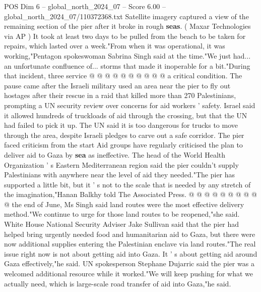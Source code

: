 \begin{textsample}{POS Dim 6 – global\_north\_2024\_07 – Score 6.00 – global\_north\_2024\_07/110372368.txt}
Satellite imagery captured a view of the remaining section of the pier after it broke in rough \textbf{seas}. ( Maxar Technologies via AP ) It took at least two days to be pulled from the beach to be taken for repairs, which lasted over a week."From when it was operational, it was working,"Pentagon spokeswoman Sabrina Singh said at the time."We just had... an unfortunate confluence of... storms that made it inoperable for a bit."During that incident, three service @ @ @ @ @ @ @ @ @ @ a critical condition.
The pause came after the Israeli military used an area near the pier to fly out hostages after their rescue in a raid that killed more than 270 Palestinians, prompting a UN security review over concerns for aid workers ' safety.
Israel said it allowed hundreds of truckloads of aid through the crossing, but that the UN had failed to pick it up.
The UN said it is too dangerous for trucks to move through the area, despite Israeli pledges to carve out a safe corridor.
The pier faced criticism from the start Aid groups have regularly criticised the plan to deliver aid to Gaza by \textbf{sea} as ineffective.
The head of the World Health Organization ' s Eastern Mediterranean region said the pier couldn't supply Palestinians with anywhere near the level of aid they needed."The pier has supported a little bit, but it ' s not to the scale that is needed by any stretch of the imagination,"Hanan Balkhy told The Associated Press. @ @ @ @ @ @ @ @ @ @ the end of June, Ms Singh said land routes were the most effective delivery method."We continue to urge for those land routes to be reopened,"she said.
White House National Security Adviser Jake Sullivan said that the pier had helped bring urgently needed food and humanitarian aid to Gaza, but there were now additional supplies entering the Palestinian enclave via land routes."The real issue right now is not about getting aid into Gaza.
It ' s about getting aid around Gaza effectively,"he said.
UN spokesperson Stephane Dujarric said the pier was a welcomed additional resource while it worked."We will keep pushing for what we actually need, which is large-scale road transfer of aid into Gaza,"he said.

\end{textsample}
